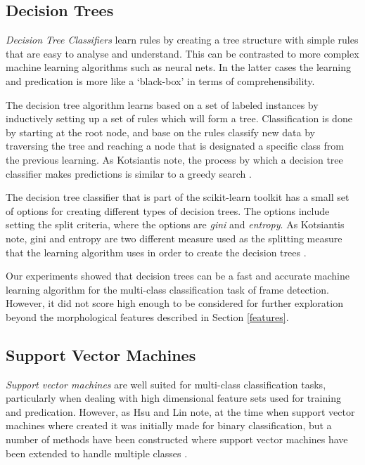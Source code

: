 \subsection{Decision Trees}

\textit{Decision Tree Classifiers} learn rules by creating a tree structure with simple rules that are easy to analyse and understand. This can be contrasted to more complex machine learning algorithms such as neural nets. In the latter cases the learning and predication is more like a `black-box' in terms of comprehensibility.

The decision tree algorithm learns based on a set of labeled instances by inductively setting up a set of rules which will form a tree. Classification is done by starting at the root node, and base on the rules classify new data by traversing the tree and reaching a node that is designated a specific class from the previous learning. As Kotsiantis note, the process by which a decision tree classifier makes predictions is similar to a greedy search \cite{Kotsiantis:13}.

The decision tree classifier that is part of the scikit-learn toolkit has a small set of options for creating different types of decision trees. The options include setting the split criteria, where the options are \textit{gini} and \textit{entropy}. As Kotsiantis note, gini and entropy are two different measure used as the splitting measure that the learning algorithm uses in order to create the decision trees \cite{Kotsiantis:13}.

Our experiments showed that decision trees can be a fast and accurate machine learning algorithm for the multi-class classification task of frame detection. However, it did not score high enough to be considered for further exploration beyond the morphological features described in Section \ref{features}.

\subsection{Support Vector Machines}

\textit{Support vector machines} are well suited for multi-class classification tasks, particularly when dealing with high dimensional feature sets used for training and predication. However, as Hsu and Lin note, at the time when support vector machines where created it was initially made for binary classification, but a number of methods have been constructed where support vector machines have been extended to handle multiple classes \cite{Hsu:02}.

